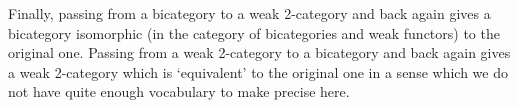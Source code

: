 Finally, passing from a bicategory to a weak 2-category and back again gives
a bicategory isomorphic (in the category of bicategories and weak functors)
to the original one.  Passing from a weak 2-category to a bicategory and back
again gives a weak 2-category which is `equivalent' to the original one in a
sense which we do not have quite enough vocabulary to make precise here.




\clearpage












